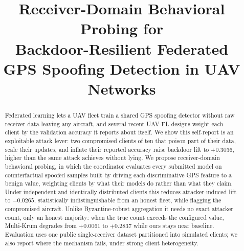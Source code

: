 \documentclass[conference]{IEEEtran}
\begin{document}
\title{Receiver-Domain Behavioral Probing for\\
Backdoor-Resilient Federated\\
GPS Spoofing Detection in UAV Networks}

\author{
}

\maketitle

\begin{abstract}
Federated learning lets a UAV fleet train a shared GPS spoofing detector
without raw receiver data leaving any aircraft, and several recent UAV-FL
designs weight each client by the validation accuracy it reports about itself.
We show this self-report is an exploitable attack lever: two compromised
clients of ten that poison part of their data, scale their updates, and inflate
their reported accuracy raise backdoor lift to $+0.3036$, higher than the same
attack achieves without lying. We propose receiver-domain behavioral probing,
in which the coordinator evaluates every submitted model on counterfactual
spoofed samples built by driving each discriminative GPS feature to a benign
value, weighting clients by what their models do rather than what they claim.
Under independent and identically distributed clients this reduces
attacker-induced lift to $-0.0265$, statistically indistinguishable from an
honest fleet, while flagging the compromised aircraft. Unlike Byzantine-robust
aggregation it needs no exact attacker count, only an honest majority: when the
true count exceeds the configured value, Multi-Krum degrades from $+0.0061$ to
$+0.2837$ while ours stays near baseline. Evaluation uses one public
single-receiver dataset partitioned into simulated clients; we also report
where the mechanism fails, under strong client heterogeneity.
\end{abstract}
\end{document}
